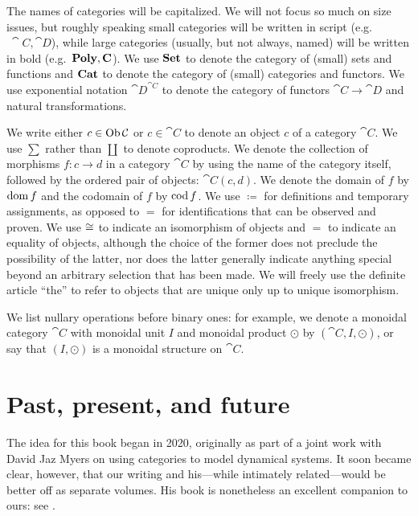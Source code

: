 \documentclass[Book-Poly]{subfiles}
\begin{document}

The names of categories will be capitalized.
We will not focus so much on size issues, but roughly speaking small categories will be written in script (e.g.$\ \cat{C}, \cat{D}$), while large categories (usually, but not always, named) will be written in bold (e.g.\ $\mathbf{Poly}, \mathbf{C}$).
We use $\mathbf{Set}$ to denote the category of (small) sets and functions and $\mathbf{Cat}$ to denote the category of (small) categories and functors.
We use exponential notation $\cat{D}^{\cat{C}}$ to denote the category of functors $\cat{C}\to\cat{D}$ and natural transformations.

We write either $c\in\operatorname{Ob}\mathcal{C}$ or $c\in\cat{C}$ to denote an object $c$ of a category $\cat{C}$.
We use $\sum$ rather than $\coprod$ to denote coproducts.
We denote the collection of morphisms $f\colon c\to d$ in a category $\cat{C}$ by using the name of the category itself, followed by the ordered pair of objects: $\cat{C}(c,d)$.
We denote the domain of $f$ by $\operatorname{dom} f$ and the codomain of $f$ by $\operatorname{cod} f$.
We use $\coloneqq$ for definitions and temporary assignments, as opposed to $=$ for identifications that can be observed and proven.
We use $\cong$ to indicate an isomorphism of objects and $=$ to indicate an equality of objects, although the choice of the former does not preclude the possibility of the latter, nor does the latter generally indicate anything special beyond an arbitrary selection that has been made.
We will freely use the definite article ``the'' to refer to objects that are unique only up to unique isomorphism.


We list nullary operations before binary ones: for example, we denote a monoidal category $\cat{C}$ with monoidal unit $I$ and monoidal product $\odot$ by $(\cat{C},I,\odot)$, or say that $(I,\odot)$ is a monoidal structure on $\cat{C}$.

\section{Past, present, and future}

The idea for this book began in 2020, originally as part of a joint work with David Jaz Myers on using categories to model dynamical systems.
It soon became clear, however, that our writing and his---while intimately related---would be better off as separate volumes.
His book is nonetheless an excellent companion to ours: see \cite{jaz}.
\end{document}
